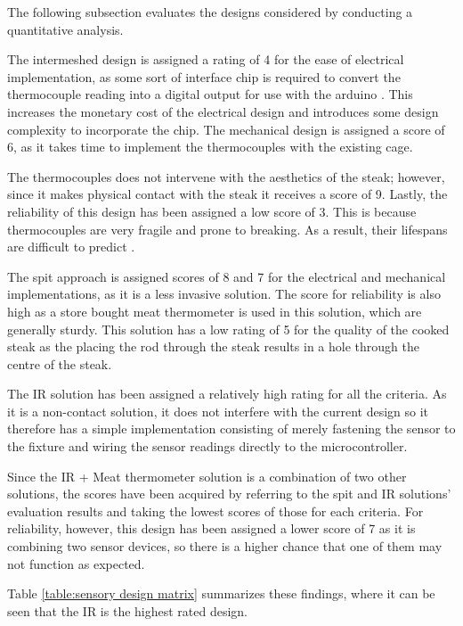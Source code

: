 \documentclass[11pt]{article}
\begin{document}
The following subsection evaluates the designs considered by conducting a quantitative analysis.

The intermeshed design is assigned a rating of 4 for the ease of electrical implementation, as some sort of interface chip is required to convert the thermocouple reading into a digital output for use with the arduino \cite{se6}.
This increases the monetary cost of the electrical  design and introduces some design complexity to incorporate the chip.
The mechanical design is assigned a score of 6, as it takes time to implement the thermocouples with the existing cage.

The thermocouples does not intervene with the aesthetics of the steak; however, since it makes physical contact with the steak it receives a score of 9.
Lastly, the reliability of this design has been assigned a low score of 3.
This is because thermocouples are very fragile and prone to breaking.
As a result, their lifespans are difficult to predict \cite{se1}.

The spit approach is assigned scores of 8 and 7 for the electrical and mechanical implementations, as it is a less invasive solution.
The score for reliability is also high as a store bought meat thermometer is used in this solution, which are generally sturdy.
This solution has a low rating of 5 for the quality of the cooked steak as the placing the rod through the steak results in a hole through the centre of the steak.

The IR solution has been assigned a relatively high rating for all the criteria.
As it is a non-contact solution, it does not interfere with the current design so it therefore has a simple implementation consisting of merely fastening the sensor to the fixture and wiring the sensor readings directly to the microcontroller. 

Since the IR + Meat thermometer solution is a combination of two other solutions, the scores have been acquired by referring to the spit and IR solutions’ evaluation results and taking the lowest scores of those for each criteria.
For reliability, however, this design has been assigned a lower score of 7 as it is combining two sensor devices, so there is a higher chance that one of them may not function as expected.

Table \ref{table:sensory design matrix} summarizes these findings, where it can be seen that the IR is the highest rated design.
\end{document}
